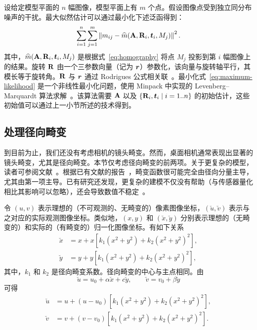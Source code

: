 设给定模型平面的 $n$ 幅图像，模型平面上有 $m$ 个点。假设图像点受到独立同分布噪声的干扰。最大似然估计可以通过最小化下述泛函得到：
\begin{equation}
\sum_{i=1}^{n}\sum_{j=1}^{m}
\left\lVert m_{ij}-\widehat{m}(\mathbf{A},\mathbf{R}_i,\boldsymbol{t}_i,M_j)\right\rVert^2 .
\label{eq:maximum-likelihood}
\end{equation}
其中，$\widehat{m}(\mathbf{A},\mathbf{R}_i,\boldsymbol{t}_i,M_j)$ 是根据式~\eqref{eq:homography} 将点 $M_j$ 投影到第 $i$ 幅图像上的结果。旋转 $\mathbf{R}$ 由一个三参数向量（记为 $\boldsymbol{r}$）参数化，该向量与旋转轴平行，其模长等于旋转角。$\mathbf{R}$ 与 $\boldsymbol{r}$ 通过 Rodrigues 公式相关联~\cite{faugeras1993three}。最小化式~\eqref{eq:maximum-likelihood} 是一个非线性最小化问题，使用 Minpack 中实现的 Levenberg--Marquardt 算法求解~\cite{more1977levenberg}。该算法需要 $\mathbf{A}$ 以及 $\{\mathbf{R}_i,\boldsymbol{t}_i\mid i=1..n\}$ 的初始估计，这些初始值可以通过上一小节所述的技术得到。

\subsection{处理径向畸变}\label{subsec:radial-distortion}

到目前为止，我们还没有考虑相机的镜头畸变。然而，桌面相机通常表现出显著的镜头畸变，尤其是径向畸变。本节仅考虑径向畸变的前两项。关于更复杂的模型，读者可参阅文献~\cite{slama1980manual,brown1971close,faig1975calibration,weng1992camera}。根据已有文献的报告~\cite{brown1971close,tsai1987versatile,wei1994implicit}，畸变函数很可能完全由径向分量主导，尤其由第一项主导。已有研究还发现，更复杂的建模不仅没有帮助（与传感器量化相比其影响可以忽略），还会导致数值不稳定~\cite{tsai1987versatile,wei1994implicit}。

令 $(u,v)$ 表示理想的（不可观测的、无畸变的）像素图像坐标，$(\breve{u},\breve{v})$ 表示与之对应的实际观测图像坐标。类似地，$(x,y)$ 和 $(\breve{x},\breve{y})$ 分别表示理想的（无畸变的）和实际的（有畸变的）归一化图像坐标。有如下关系~\cite{brown1971close,wei1994implicit}
\begin{align*}
\breve{x}&=x+x\left[k_1(x^2+y^2)+k_2(x^2+y^2)^2\right],\\
\breve{y}&=y+y\left[k_1(x^2+y^2)+k_2(x^2+y^2)^2\right],
\end{align*}
其中，$k_1$ 和 $k_2$ 是径向畸变系数。径向畸变的中心与主点相同。由
\begin{equation*}
\breve{u}=u_0+\alpha\breve{x}+c\breve{y},\qquad
\breve{v}=v_0+\beta\breve{y}
\end{equation*}
可得
\begin{align}
\breve{u}&=u+(u-u_0)\left[k_1(x^2+y^2)+k_2(x^2+y^2)^2\right],
\label{eq:radial-distortion-u}\\
\breve{v}&=v+(v-v_0)\left[k_1(x^2+y^2)+k_2(x^2+y^2)^2\right].
\label{eq:radial-distortion-v}
\end{align}

